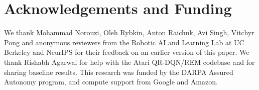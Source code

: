 \documentclass[../thesis.tex]{subfiles}
\begin{document}



\section*{Acknowledgements and Funding}
We thank Mohammad Norouzi, Oleh Rybkin, Anton Raichuk, Avi Singh, Vitchyr Pong and anonymous reviewers from the Robotic AI and Learning Lab at UC Berkeley and NeurIPS for their feedback on an earlier version of this paper. We thank Rishabh Agarwal for help with the Atari QR-DQN/REM codebase and for sharing baseline results. This research was funded by the DARPA Assured Autonomy program, and compute support from Google and Amazon.
\end{document}
